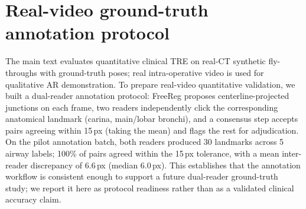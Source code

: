\documentclass[10pt]{article}
\begin{document}
\section{Real-video ground-truth annotation protocol}
\label{sec:sup_gt}
The main text evaluates quantitative clinical TRE on real-CT synthetic
fly-throughs with ground-truth poses; real intra-operative video is used for
qualitative AR demonstration. To prepare real-video quantitative validation, we
built a dual-reader annotation protocol: FreeReg proposes centerline-projected
junctions on each frame, two readers independently click the corresponding
anatomical landmark (carina, main/lobar bronchi), and a consensus step accepts
pairs agreeing within 15\,px (taking the mean) and flags the rest for
adjudication. On the pilot annotation batch, both readers produced 30
landmarks across 5 airway labels; 100\% of pairs agreed within the 15\,px
tolerance, with a mean inter-reader discrepancy of 6.6\,px (median 6.0\,px).
This establishes that the annotation workflow is consistent enough to support a
future dual-reader ground-truth study; we report it here as protocol readiness
rather than as a validated clinical accuracy claim.
\end{document}
